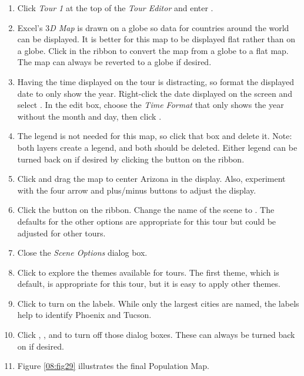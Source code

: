 \begin{enumerate}[resume]
	\item Click \textit{Tour 1} at the top of the \textit{Tour Editor} and enter . 
	\item Excel's \textit{$ 3 $D Map} is drawn on a globe so data for countries around the world can be displayed. It is better for this map to be displayed flat rather than on a globe. Click  in the ribbon to convert the map from a globe to a flat map. The map can always be reverted to a globe if desired.
	\item Having the time displayed on the tour is distracting, so format the displayed date to only show the year. Right-click the date displayed on the screen and select . In the edit box, choose the \textit{Time Format} that only shows the year without the month and day, then click .
	\item The legend is not needed for this map, so click that box and delete it. Note: both layers create a legend, and both should be deleted. Either legend can be turned back on if desired by clicking the  button on the ribbon.
	\item Click and drag the map to center Arizona in the display. Also, experiment with the four arrow and plus/minus buttons to adjust the display.
	\item Click the  button on the ribbon. Change the name of the scene to . The defaults for the other options are appropriate for this tour but could be adjusted for other tours.
	\item Close the \textit{Scene Options} dialog box.
	\item Click  to explore the themes available for tours. The first theme, which is default, is appropriate for this tour, but it is easy to apply other themes.
	\item Click  to turn on the labels. While only the largest cities are named, the labels help to identify Phoenix and Tucson.
	\item Click , , and to turn off those dialog boxes. These can always be turned back on if desired.
	\item Figure \ref{08:fig29} illustrates the final Population Map.
\end{enumerate}

